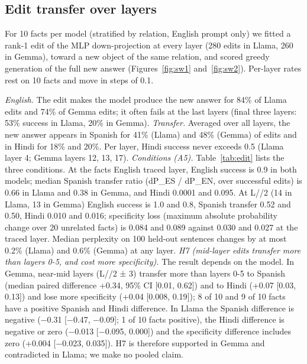 \documentclass[11pt]{article}
\begin{document}
\subsection{Edit transfer over layers}
For 10 facts per model (stratified by relation, English prompt only) we fitted a rank-1 edit of the MLP down-projection at every layer (280 edits in Llama, 260 in Gemma), toward a new object of the same relation, and scored greedy generation of the full new answer (Figures~\ref{fig:sw1} and~\ref{fig:sw2}). Per-layer rates rest on 10 facts and move in steps of 0.1.

\emph{English.} The edit makes the model produce the new answer for 84\% of Llama edits and 74\% of Gemma edits; it often fails at the last layers (final three layers: 53\% success in Llama, 20\% in Gemma). \emph{Transfer.} Averaged over all layers, the new answer appears in Spanish for 41\% (Llama) and 48\% (Gemma) of edits and in Hindi for 18\% and 20\%. Per layer, Hindi success never exceeds 0.5 (Llama layer 4; Gemma layers 12, 13, 17). \emph{Conditions (A5).} Table~\ref{tab:edit} lists the three conditions. At the fact\textquotesingle s English traced layer, English success is 0.9 in both models; median Spanish transfer ratio (dP\_ES / dP\_EN, over successful edits) is 0.66 in Llama and 0.38 in Gemma, and Hindi 0.0001 and 0.095. At L//2 (14 in Llama, 13 in Gemma) English success is 1.0 and 0.8, Spanish transfer 0.52 and 0.50, Hindi 0.010 and 0.016; specificity loss (maximum absolute probability change over 20 unrelated facts) is 0.084 and 0.089 against 0.030 and 0.027 at the traced layer. Median perplexity on 100 held-out sentences changes by at most 0.2\% (Llama) and 0.6\% (Gemma) at any layer. \emph{H7 (mid-layer edits transfer more than layers 0-5, and cost more specificity).} The result depends on the model. In Gemma, near-mid layers (L//2 ± 3) transfer more than layers 0-5 to Spanish (median paired difference +0.34, 95\% CI {[}0.01, 0.62{]}) and to Hindi (+0.07 {[}0.03, 0.13{]}) and lose more specificity (+0.04 {[}0.008, 0.19{]}); 8 of 10 and 9 of 10 facts have a positive Spanish and Hindi difference. In Llama the Spanish difference is negative (−0.31 {[}−0.47, −0.09{]}; 1 of 10 facts positive), the Hindi difference is negative or zero (−0.013 {[}−0.095, 0.000{]}) and the specificity difference includes zero (+0.004 {[}−0.023, 0.035{]}). H7 is therefore supported in Gemma and contradicted in Llama; we make no pooled claim.
\end{document}
